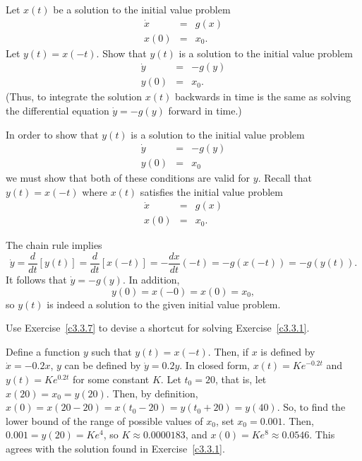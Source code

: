 \documentclass{ximera}
\begin{document}
\begin{exercise} \label{c3.3.7}
Let $x(t)$ be a solution to the initial value problem
\begin{eqnarray*}
\dot{x} & = & g(x) \\
x(0) & = & x_0.
\end{eqnarray*}
Let $y(t)=x(-t)$.  Show that $y(t)$ is a solution to the
initial value problem
\begin{eqnarray*}
\dot{y} & = & -g(y) \\
y(0) & = & x_0.
\end{eqnarray*}
(Thus, to integrate the solution $x(t)$ backwards in time is the
same as solving the differential equation $\dot{y}  =  -g(y)$
forward in time.)

\begin{solution}

In order to show that $y(t)$ is a solution to the initial value problem
\[
\begin{array}{rcl}
\dot{y} & = & -g(y) \\
y(0) & = & x_0\end{array}
\]
we must show that both of these conditions are valid for $y$.  Recall that
$y(t) = x(-t)$ where $x(t)$ satisfies the initial value problem
\[ \begin{array}{rcl}
\dot{x} & = & g(x) \\
x(0) & = & x_0.\end{array} \]

The chain rule implies
\[ \dot{y} = \frac{d}{dt}[y(t)] = \frac{d}{dt}[x(-t)] =
-\frac{dx}{dt}(-t) = -g(x(-t)) = -g(y(t)). \]
It follows that $\dot y = -g(y)$.
In addition,
\[ y(0) = x(-0) = x(0) = x_0, \]
so $y(t)$ is indeed a solution to the given initial value problem.

\end{solution}
\end{exercise}

\begin{exercise} \label{c3.3.9}
Use Exercise~\ref{c3.3.7} to devise a shortcut for solving
Exercise~\ref{c3.3.1}.

\begin{solution}

Define a function $y$ such that $y(t) = x(-t)$.  Then, if $x$ is defined by
$\dot{x} = -0.2x$, $y$ can be defined by $\dot{y} = 0.2y$.  In closed form,
$x(t) = Ke^{-0.2t}$ and $y(t) = Ke^{0.2t}$ for some constant $K$.  Let $t_0
= 20$, that is, let $x(20) = x_0 = y(20)$.  Then, by definition,
$x(0) = x(20 - 20) = x(t_0 - 20) = y(t_0 + 20) = y(40)$.  So, to find the
lower bound of the range of possible values of $x_0$, set $x_0 = 0.001$.
Then, $0.001 = y(20) = Ke^4$, so $K \approx 0.0000183$, and $x(0) = Ke^8
\approx 0.0546$.  This agrees with the solution found in
Exercise~\ref{c3.3.1}.


\end{solution}
\end{exercise}
\end{document}
